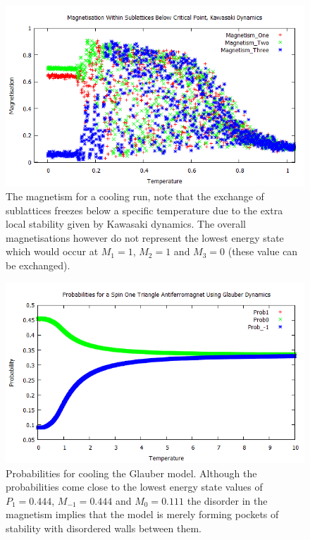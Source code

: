 \documentclass[]{article}
\begin{document}
\begin{figure}
\begin{center}
\includegraphics[scale=0.75]{Mag_K_BCP}
\caption{The magnetism for a cooling run, note that the exchange of sublattices freezes below a specific temperature due to the extra local stability given by Kawasaki dynamics. The overall magnetisations however do not represent the lowest energy state which would occur at $M_{1}=1$, $M_{2}=1$ and $M_{3}=0$ (these value can be exchanged).}
\label{Mag_K_BCP}
\end{center}
\end{figure}

\begin{figure}
\begin{center}
\includegraphics[scale=0.75]{Prob_G}
\caption{Probabilities for cooling the Glauber model. Although the probabilities come close to the lowest energy state values of $P_{1}=0.444$, $M_{-1}=0.444$ and $M_{0}=0.111$ the disorder in the magnetism implies that the model is merely forming pockets of stability with disordered walls between them.}
\label{Prob_G}
\end{center}
\end{figure}
\end{document}
